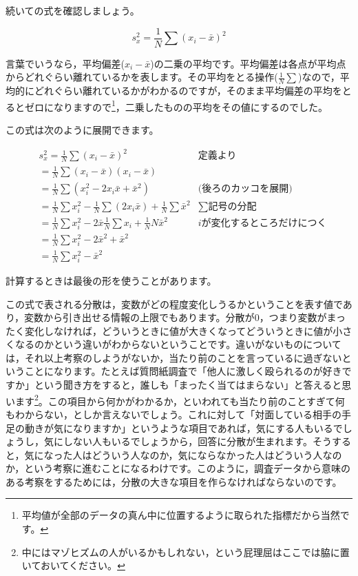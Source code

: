 \documentclass{ltjsbook}
\begin{document}
続いての式を確認しましょう。

\[ s_x^2 = \frac{1}{N}\sum(x_i - \bar{x})^2 \]

言葉でいうなら，平均偏差($x_i - \bar{x}$)の二乗の平均です。平均偏差は各点が平均点からどれぐらい離れているかを表します。その平均をとる操作($\frac{1}{N}\sum$)なので，平均的にどれぐらい離れているかがわかるのですが，そのまま平均偏差の平均をとるとゼロになりますので\footnote{平均値が全部のデータの真ん中に位置するように取られた指標だから当然です。}，二乗したものの平均をその値にするのでした。

この式は次のように展開できます。

\begin{align*}
	 & s_x^2  =  \frac{1}{N}\sum(x_i - \bar{x})^2                                          & \mbox{定義より}             \\
	 & =  \frac{1}{N}\sum(x_i - \bar{x})(x_i - \bar{x})                                    & \mbox{}                 \\
	 & =  \frac{1}{N}\sum(x_i ^ 2 - 2x_i\bar{x} + \bar{x}^2)                               & \mbox{(後ろのカッコを展開)}        \\
	 & =  \frac{1}{N}\sum x_i^2 - \frac{1}{N}\sum(2x_i\bar{x}) + \frac{1}{N}\sum \bar{x}^2 & \mbox{$\sum$記号の分配}      \\
	 & =  \frac{1}{N}\sum x_i^2 - 2\bar{x}\frac{1}{N}\sum x_i + \frac{1}{N} N\bar{x}^2     & \mbox{$i$が変化するところだけにつく} \\
	 & =  \frac{1}{N}\sum x_i^2 -2\bar{x}^2  + \bar{x}^2                                   & \mbox{}                 \\
	 & =  \frac{1}{N}\sum x_i^2 -\bar{x}^2
\end{align*}

計算するときは最後の形を使うことがあります。

この式で表される分散は，変数がどの程度変化しうるかということを表す値であり，変数から引き出せる情報の上限でもあります。分散が$0$，つまり変数がまったく変化しなければ，どういうときに値が大きくなってどういうときに値が小さくなるのかという違いがわからないということです。違いがないものについては，それ以上考察のしようがないか，当たり前のことを言っているに過ぎないということになります。たとえば質問紙調査で「他人に激しく殴られるのが好きですか」という聞き方をすると，誰しも「まったく当てはまらない」と答えると思います\footnote{中にはマゾヒズムの人がいるかもしれない，という屁理屈はここでは脇に置いておいてください。}。この項目から何かがわかるか，といわれても当たり前のことすぎて何もわからない，としか言えないでしょう。これに対して「対面している相手の手足の動きが気になりますか」というような項目であれば，気にする人もいるでしょうし，気にしない人もいるでしょうから，回答に分散が生まれます。そうすると，気になった人はどういう人なのか，気にならなかった人はどういう人なのか，という考察に進むことになるわけです。このように，調査データから意味のある考察をするためには，分散の大きな項目を作らなければならないのです。
\end{document}
